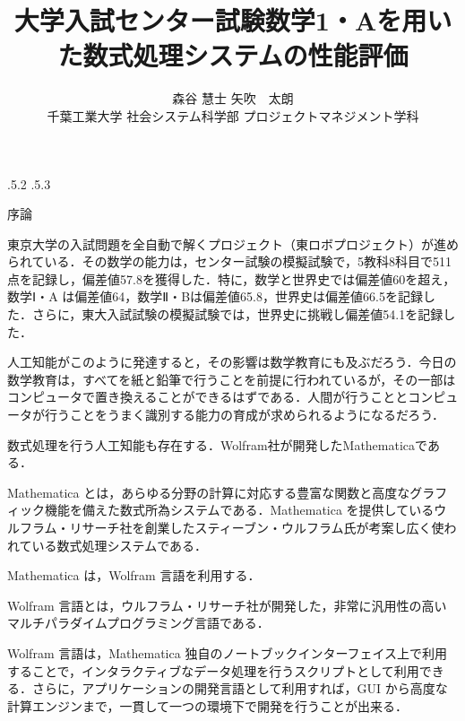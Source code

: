 \documentclass[uplatex,twocolumn]{jsarticle}
\title{\vspace{-14mm}大学入試センター試験数学1・Aを用いた数式処理システムの性能評価 \footnotemark[0]}
\author{森谷 慧士 \footnotemark[2] 矢吹　太朗  \\ 千葉工業大学 社会システム科学部 プロジェクトマネジメント学科\footnotemark[2]}
\date{}%
\makeatletter
\renewcommand{\section}{%
    \if@slide\clearpage\fi
    \@startsection{section}{1}{\z@}%
    {\Cvs \@plus.5\Cdp \@minus.2\Cdp}%
    {.5\Cvs \@plus.3\Cdp}%
    {\normalfont\raggedright}}
\makeatother
\begin{document}
\twocolumn[
	\maketitle
]

\begingroup
\def\thefootnote{\fnsymbol{footnote}}
\endgroup




\section{序論}


 
東京大学の入試問題を全自動で解くプロジェクト（東ロボプロジェクト）が進められている\cite{arai2014}．その数学の能力は，センター試験の模擬試験で，5教科8科目で511点を記録し，偏差値57.8を獲得した．特に，数学と世界史では偏差値60を超え，数学Ⅰ・A は偏差値64，数学Ⅱ・Bは偏差値65.8，世界史は偏差値66.5を記録した．さらに，東大入試試験の模擬試験では，世界史に挑戦し偏差値54.1を記録した\cite{tourobo}．

人工知能がこのように発達すると，その影響は数学教育にも及ぶだろう．今日の数学教育は，すべてを紙と鉛筆で行うことを前提に行われているが，その一部は コンピュータで置き換えることができるはずである．人間が行うこととコンピュータが行うことをうまく識別する能力の育成が求められるようになるだろう．



数式処理を行う人工知能も存在する．Wolfram社が開発したMathematicaである．

Mathematica とは，あらゆる分野の計算に対応する豊富な関数と高度なグラフィック機能を備えた数式所為システムである．Mathematica を提供しているウルフラム・リサーチ社を創業したスティーブン・ウルフラム氏が考案し広く使われている数式処理システムである\cite{wolfram2014}．

Mathematica は，Wolfram 言語を利用する．

Wolfram 言語とは，ウルフラム・リサーチ社が開発した，非常に汎用性の高いマルチパラダイムプログラミング言語である．

Wolfram 言語は，Mathematica 独自のノートブックインターフェイス上で利用することで，インタラクティブなデータ処理を行うスクリプトとして利用できる．さらに，アプリケーションの開発言語として利用すれば，GUI から高度な計算エンジンまで，一貫して一つの環境下で開発を行うことが出来る．
\end{document}

